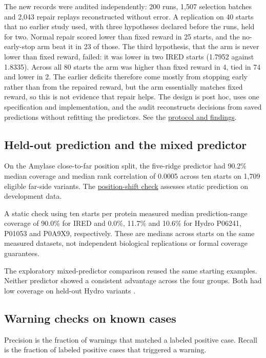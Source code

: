 \documentclass[11pt,a4paper]{article}
\begin{document}
The new records were audited independently: 200 runs, 1,507 selection batches and 2,043 repair replays reconstructed without error. A replication on 40 starts that no earlier study used, with three hypotheses declared before the runs, held for two. Normal repair scored lower than fixed reward in 25 starts, and the no-early-stop arm beat it in 23 of those. The third hypothesis, that the arm is never lower than fixed reward, failed: it was lower in two IRED starts (1.7952 against 1.8335). Across all 80 starts the arm was higher than fixed reward in 4, tied in 74 and lower in 2. The earlier deficits therefore come mostly from stopping early rather than from the repaired reward, but the arm essentially matches fixed reward, so this is not evidence that repair helps. The design is post hoc, uses one specification and implementation, and the audit reconstructs decisions from saved predictions without refitting the predictors. See the \href{../docs/studies/repair/repair_without_stopping.md}{protocol and findings}.

\subsection{Held-out prediction and the mixed predictor}
On the Amylase close-to-far position split, the five-ridge predictor had 90.2\% median coverage and median rank correlation of 0.0005 across ten starts on 1,709 eligible far-side variants. The \href{../docs/studies/amylase/position_shift.md}{position-shift check} assesses static prediction on development data.

A static check using ten starts per protein measured median prediction-range coverage of 90.0\% for IRED and 0.0\%, 11.7\% and 10.6\% for Hydro P06241, P01053 and P0A9X9, respectively. These are medians across starts on the same measured datasets, not independent biological replications or formal coverage guarantees.

The exploratory mixed-predictor comparison reused the same starting examples. Neither predictor showed a consistent advantage across the four groups. Both had low coverage on held-out Hydro variants \cite{mixed}.

\newpage
\subsection{Warning checks on known cases}
Precision is the fraction of warnings that matched a labeled positive case. Recall is the fraction of labeled positive cases that triggered a warning.
\end{document}
